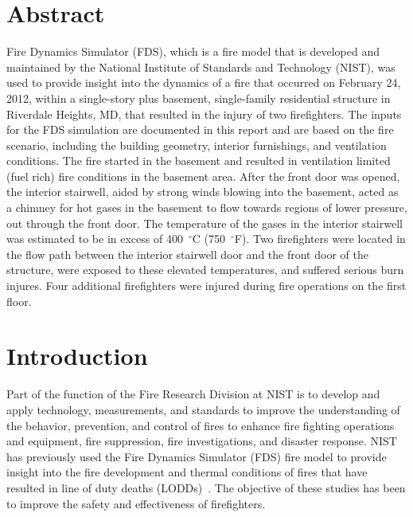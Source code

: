 \documentclass[12pt,oneside]{book}
\begin{document}
\chapter*{\centering Abstract}
Fire Dynamics Simulator (FDS), which is a fire model that is developed and maintained by the National Institute of Standards and Technology (NIST), was used to provide insight into the dynamics of a fire that occurred on February 24, 2012, within a single-story plus basement, single-family residential structure in Riverdale Heights, MD, that resulted in the injury of two firefighters. The inputs for the FDS simulation are documented in this report and are based on the fire scenario, including the building geometry, interior furnishings, and ventilation conditions. The fire started in the basement and resulted in ventilation limited (fuel rich) fire conditions in the basement area. After the front door was opened, the interior stairwell, aided by strong winds blowing into the basement, acted as a chimney for hot gases in the basement to flow towards regions of lower pressure, out through the front door. The temperature of the gases in the interior stairwell was estimated to be in excess of 400~$^{\circ}$C (750~$^{\circ}$F). Two firefighters were located in the flow path between the interior stairwell door and the front door of the structure, were exposed to these elevated temperatures, and suffered serious burn injures. Four additional firefighters were injured during fire operations on the first floor.

\chapter{Introduction}
\setcounter{page}{1}
Part of the function of the Fire Research Division at NIST is to develop and apply technology, measurements, and standards to improve the understanding of the behavior, prevention, and control of fires to enhance fire fighting operations and equipment, fire suppression, fire investigations, and disaster response. NIST has previously used the Fire Dynamics Simulator (FDS) fire model to provide insight into the fire development and thermal conditions of fires that have resulted in line of duty deaths (LODDs)~\cite{Madrzykowski:1,Iowa,Texas,Bryner:Charleston,barowy:texas,Weinschenk:Chicago,Overholt:San_Francisco}. The objective of these studies has been to improve the safety and effectiveness of firefighters.
\end{document}
